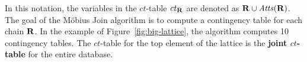 \documentclass{sig-alternate-2013}
\newcommand{\ct}{\mathit{ct}}
\begin{document}
In this notation, the variables in the $\ct$-table  $\ct_{\set{\Relation}}$  are denoted as $\mathbf{R} \cup \it{Atts}({\mathbf{R}})$. 
%
%
The goal of the M\"obius Join algorithm is to compute a contingency table for each chain $\mathbf{R}$. 
In the example of Figure~\ref{fig:big-lattice}, the algorithm computes 10 contingency tables. The $\ct$-table for the top element of the lattice is the \textbf{joint $\ct$-table} for the entire database. 
\end{document}
